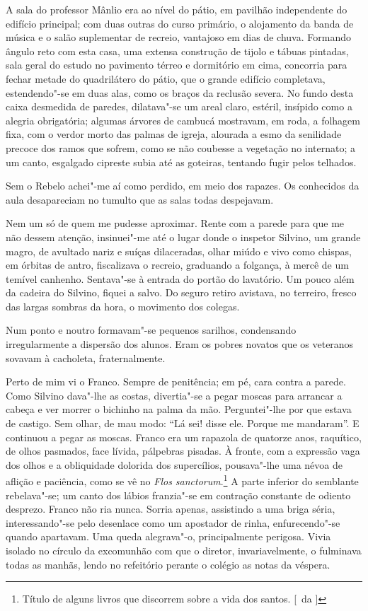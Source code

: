 A sala do professor Mânlio era ao nível do
pátio, em pavilhão independente do edifício principal; com duas outras
do curso primário, o alojamento da banda de música e o salão
suplementar de recreio, vantajoso em dias de chuva. Formando ângulo reto com 
esta casa, uma extensa construção de tijolo e tábuas pintadas, sala geral do
estudo no pavimento térreo e dormitório em cima, concorria para fechar
metade do quadrilátero do pátio, que o grande edifício completava,
estendendo"-se em duas alas, como os braços da reclusão severa. No
fundo desta caixa desmedida de paredes, dilatava"-se um areal claro,
estéril, insípido como a alegria obrigatória; algumas árvores de
cambucá mostravam, em roda, a folhagem fixa, com o verdor morto das
palmas de igreja, alourada a esmo da senilidade precoce dos ramos que
sofrem, como se não coubesse a vegetação no internato; a um canto,
esgalgado cipreste subia até as goteiras, tentando fugir pelos telhados. 

Sem o Rebelo achei"-me aí como perdido, em meio dos rapazes.
Os conhecidos da aula desapareciam no tumulto que as salas todas despejavam. 

Nem um só de quem me pudesse aproximar. Rente com a parede
para que me não dessem atenção, insinuei"-me até o lugar donde o
inspetor Silvino, um grande magro, de avultado nariz e suíças
dilaceradas, olhar miúdo e vivo como chispas, em órbitas de antro,
fiscalizava o recreio, graduando a folgança, à mercê de um temível
canhenho. Sentava"-se à entrada do portão do lavatório. Um pouco além
da cadeira do Silvino, fiquei a salvo. Do seguro retiro avistava, no
terreiro, fresco das largas sombras da hora, o movimento dos colegas.

Num ponto e noutro formavam"-se pequenos sarilhos, condensando
irregularmente a dispersão dos alunos. Eram os pobres novatos que os
veteranos sovavam à cacholeta, fraternalmente. 

Perto de mim vi o Franco. Sempre de penitência; em pé, cara contra a parede. 
Como Silvino dava"-lhe as costas, divertia"-se a pegar moscas para arrancar a
cabeça e ver morrer o bichinho na palma da mão. Perguntei"-lhe por que
estava de castigo. Sem olhar, de mau modo: ``Lá sei! disse ele. Porque
me mandaram''. E continuou a pegar as moscas. Franco era um rapazola de
quatorze anos, raquítico, de olhos pasmados, face lívida, pálpebras
pisadas. À fronte, com a expressão vaga dos olhos e a obliquidade
dolorida dos supercílios, pousava"-lhe uma névoa de aflição e
paciência, como se vê no \textit{Flos sanctorum}.\footnote{ Título de alguns 
livros que discorrem sobre a vida dos santos. [~da ]} A parte inferior do semblante
rebelava"-se; um canto dos lábios franzia"-se em contração constante
de odiento desprezo. Franco não ria nunca. Sorria apenas, assistindo a
uma briga séria, interessando"-se pelo desenlace como um apostador de
rinha, enfurecendo"-se quando apartavam. Uma queda alegrava"-o,
principalmente perigosa. Vivia isolado no círculo da excomunhão com que
o diretor, invariavelmente, o fulminava todas as manhãs, lendo no
refeitório perante o colégio as notas da véspera. 


